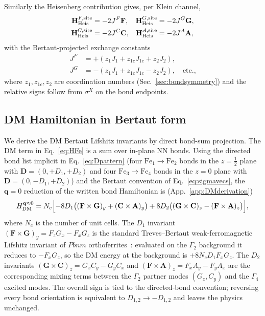 \documentclass[reprint,amsmath,amssymb,aps,prb,longbibliography]{revtex4-2}
\newcommand{\bfH}{\mathbf{H}}
\newcommand{\bfF}{\mathbf{F}}
\newcommand{\bfG}{\mathbf{G}}
\newcommand{\bfA}{\mathbf{A}}
\newcommand{\bfC}{\mathbf{C}}
\newcommand{\half}{\tfrac{1}{2}}
\begin{document}
Similarly the Heisenberg contribution gives, per Klein channel,
\begin{equation}
\begin{aligned}
\bfH^{F,{\rm site}}_{\rm Heis} &= -2 J^F\bfF, &
\bfH^{G,{\rm site}}_{\rm Heis} &= -2 J^G\bfG,\\
\bfH^{C,{\rm site}}_{\rm Heis} &= -2 J^C\bfC, &
\bfH^{A,{\rm site}}_{\rm Heis} &= -2 J^A\bfA,
\end{aligned}
\label{eq:HXHeis}
\end{equation}
with the Bertaut-projected exchange constants
\begin{equation}
\begin{aligned}
J^F &= +(z_1 J_1 + z_{1c} J_{1c} + z_2 J_2),\\
J^G &= -(z_1 J_1 + z_{1c} J_{1c} - z_2 J_2),\quad\text{etc.,}
\end{aligned}
\label{eq:JXdef}
\end{equation}
where $z_1, z_{1c}, z_2$ are coordination numbers (Sec.~\ref{sec:bondsymmetry})
and the relative signs follow from $\sigma^X$ on the bond endpoints.

\subsection{DM Hamiltonian in Bertaut form}

We derive the DM Bertaut Lifshitz invariants by direct bond-sum
projection. The DM term in Eq.~\eqref{eq:HFe} is a sum over in-plane NN
bonds. Using the directed bond list implicit in Eq.~\eqref{eq:Dpattern}
(four $\mathrm{Fe}_1\!\to\!\mathrm{Fe}_2$ bonds in the $z=\half$ plane with
$\mathbf D=(0,+D_1,+D_2)$ and four $\mathrm{Fe}_3\!\to\!\mathrm{Fe}_4$
bonds in the $z=0$ plane with $\mathbf D=(0,-D_1,+D_2)$) and the Bertaut
convention of Eq.~\eqref{eq:sigmavecs}, the $\mathbf q\!=\!0$ reduction of
the written bond Hamiltonian is (App.~\ref{app:DMderivation})
\begin{equation}
H_{\rm DM}^{\mathbf q\approx 0} = N_c\Bigl[
-8 D_1\bigl((\bfF\times\bfG)_y + (\bfC\times\bfA)_y\bigr)
+ 8 D_2\bigl((\bfG\times\bfC)_z - (\bfF\times\bfA)_z\bigr)
\Bigr],
\label{eq:HDMBertaut}
\end{equation}
where $N_c$ is the number of unit cells. The $D_1$ invariant
$(\bfF\times\bfG)_y = F_zG_x-F_xG_z$ is the standard
Treves--Bertaut weak-ferromagnetic Lifshitz invariant of $Pbnm$
orthoferrites~\cite{Treves1965,Bertaut1968,Herrmann1963}: evaluated on
the $\Gamma_2$ background it reduces to $-F_xG_z$, so the DM
energy at the background is $+8 N_c D_1 F_x G_z$. The $D_2$ invariants
$(\bfG\times\bfC)_z = G_xC_y-G_yC_x$ and $(\bfF\times\bfA)_z = F_xA_y-F_yA_x$
are the corresponding mixing terms between the $\Gamma_2$ partner modes
$(G_z,C_y)$ and the $\Gamma_4$ excited modes. The overall sign is tied
to the directed-bond convention; reversing every bond orientation is
equivalent to $D_{1,2}\to-D_{1,2}$ and leaves the physics unchanged.
\end{document}
